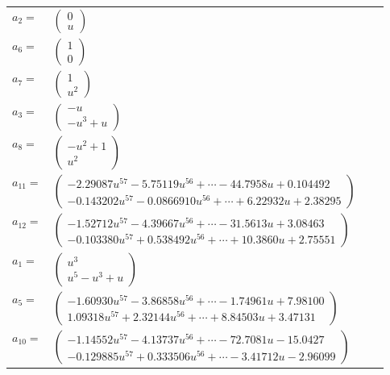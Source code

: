 \documentclass[1p]{elsarticle_modified}
\theoremstyle{definition}
\begin{document}
\begin{tabular}{m{7pt} m{180pt} m{7pt} m{180pt} }
\flushright $a_{2}=$&$\begin{pmatrix}0\\u\end{pmatrix}$ \\
\flushright $a_{6}=$&$\begin{pmatrix}1\\0\end{pmatrix}$ \\
\flushright $a_{7}=$&$\begin{pmatrix}1\\u^2\end{pmatrix}$ \\
\flushright $a_{3}=$&$\begin{pmatrix}- u\\- u^3+u\end{pmatrix}$ \\
\flushright $a_{8}=$&$\begin{pmatrix}- u^2+1\\u^2\end{pmatrix}$ \\
\flushright $a_{11}=$&$\begin{pmatrix}-2.29087 u^{57}-5.75119 u^{56}+\cdots-44.7958 u+0.104492\\-0.143202 u^{57}-0.0866910 u^{56}+\cdots+6.22932 u+2.38295\end{pmatrix}$ \\
\flushright $a_{12}=$&$\begin{pmatrix}-1.52712 u^{57}-4.39667 u^{56}+\cdots-31.5613 u+3.08463\\-0.103380 u^{57}+0.538492 u^{56}+\cdots+10.3860 u+2.75551\end{pmatrix}$ \\
\flushright $a_{1}=$&$\begin{pmatrix}u^3\\u^5- u^3+u\end{pmatrix}$ \\
\flushright $a_{5}=$&$\begin{pmatrix}-1.60930 u^{57}-3.86858 u^{56}+\cdots-1.74961 u+7.98100\\1.09318 u^{57}+2.32144 u^{56}+\cdots+8.84503 u+3.47131\end{pmatrix}$ \\
\flushright $a_{10}=$&$\begin{pmatrix}-1.14552 u^{57}-4.13737 u^{56}+\cdots-72.7081 u-15.0427\\-0.129885 u^{57}+0.333506 u^{56}+\cdots-3.41712 u-2.96099\end{pmatrix}$ \\

\end{tabular}
\end{document}
